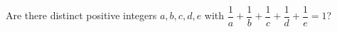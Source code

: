 Are there distinct positive integers $a,b,c,d,e$ with $\dfrac1a+\dfrac1b+\dfrac1c+\dfrac1d+\dfrac1e=1$?
